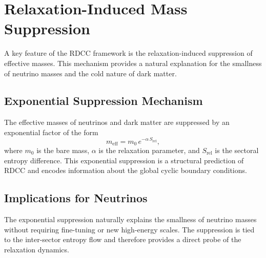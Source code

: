 \documentclass[11pt,a4paper]{article}
\newcommand{\alphaR}{\alpha}
\begin{document}

\section{Relaxation-Induced Mass Suppression}

A key feature of the RDCC framework is the relaxation-induced suppression of
effective masses. This mechanism provides a natural explanation for the
smallness of neutrino masses and the cold nature of dark matter.




\subsection{Exponential Suppression Mechanism}

The effective masses of neutrinos and dark matter are suppressed by an
exponential factor of the form
\begin{equation}
m_{\mathrm{eff}}
    = m_{0}\, e^{-\alphaR\, S_{\mathrm{rel}}},
\end{equation}
where $m_{0}$ is the bare mass, $\alphaR$ is the relaxation parameter, and
$S_{\mathrm{rel}}$ is the sectoral entropy difference. This exponential
suppression is a structural prediction of RDCC and encodes information about
the global cyclic boundary conditions.




\subsection{Implications for Neutrinos}

The exponential suppression naturally explains the smallness of neutrino masses
without requiring fine-tuning or new high-energy scales. The suppression is
tied to the inter-sector entropy flow and therefore provides a direct probe of
the relaxation dynamics.
\end{document}
